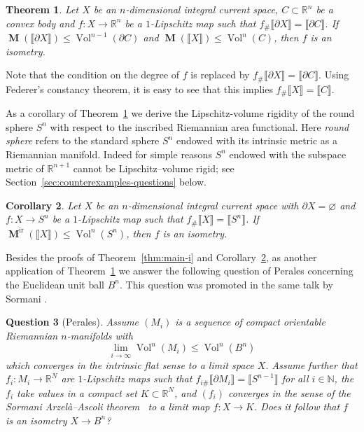\documentclass[reqno]{amsart}
\newtheorem{theorem}{Theorem}[section]
\newtheorem{question}[theorem]{Question}
\newtheorem{corollary}[theorem]{Corollary}
\numberwithin{equation}{section}
\newcommand{\N}{\mathbb{N}}
\newcommand{\vol}{\operatorname{Vol}}
\newcommand{\bb}[1]{\llbracket #1\rrbracket}
\DeclareMathOperator{\mass}{\mathbf{M}}
\DeclareMathOperator{\ir}{ir}
\begin{document}
\begin{theorem}\label{thm:rigidity-result-current-version}
Let \(X\) be an $n$-dimensional integral current space, $C\subset \mathbb{R}^n$ be a convex body and \(f\colon X\to \mathbb{R}^n\) be a \(1\)-Lipschitz map
such that \(f_\# \bb{\partial X}=\bb{\partial C}\). If \(\mass(\bb{\partial X})\leq \vol^{n-1}(\partial C)\) and \(\mass(\bb{X})\leq \vol^n(C)\), then \(f\) is an isometry.
\end{theorem}

Note that the condition on the degree of \(f\) is replaced by \(f_\# \bb{\partial X}=\bb{\partial C}\). Using Federer's constancy theorem, it is easy to see that this implies \(f_\# \bb{X}=\bb{C}\). 

As a corollary of Theorem~\ref{thm:rigidity-result-current-version} we derive the Lipschitz-volume rigidity of the round sphere $S^n$ with respect to the inscribed Riemannian area functional. Here \emph{round sphere} refers to the standard sphere $S^n$ endowed with its intrinsic metric as a Riemannian manifold. Indeed for simple reasons $S^n$ endowed with the subspace metric of $\mathbb{R}^{n+1}$ cannot be Lipschitz--volume rigid; see Section~\ref{sec:counterexamples-questions} below.

\begin{corollary}
\label{cor:sphere-rigidity}
Let \(X\) be an $n$-dimensional integral current space with $\partial X=\varnothing$ and \(f\colon X\to S^n\) be a \(1\)-Lipschitz map
such that \(f_\# \bb{X}=\bb{S^n}\). If \(\mass^{\ir}(\bb{X})\leq \vol^{n}(S^n)\), then \(f\) is an isometry.
\end{corollary}

Besides the proofs of Theorem~\ref{thm:main-i} and Corollary~\ref{cor:sphere-rigidity}, as another application of Theorem~\ref{thm:rigidity-result-current-version}  we answer the following question of Perales concerning the Euclidean unit ball $B^n$. This question was promoted in the same talk by Sormani \cite[53:12--55:40]{sor22}. 

\begin{question}[Perales]
\label{question:Perales-Sormani}
Assume $(M_i)$ is a sequence of compact orientable Riemannian $n$-manifolds with 
$$
\lim_{i\to \infty} \vol^n (M_i)\leq \vol^n(B^n)
$$ 
which converges in the intrinsic flat sense to a limit space $X$. Assume further that $f_i\colon M_i\to \mathbb{R}^N$ are $1$-Lipschitz maps such that $f_{i\#}\bb{\partial M_i}=\bb{S^{n-1}}$ for all \(i\in\N\), the $f_i$ take values in a compact set $K\subset \mathbb{R}^N$, and $(f_i)$ converges in the sense of the Sormani Arzelà--Ascoli theorem~\cite{sor18} to a limit map $f\colon X\to K$. Does it follow that \(f\) is an isometry $X\to B^n$?
\end{question}
\end{document}
